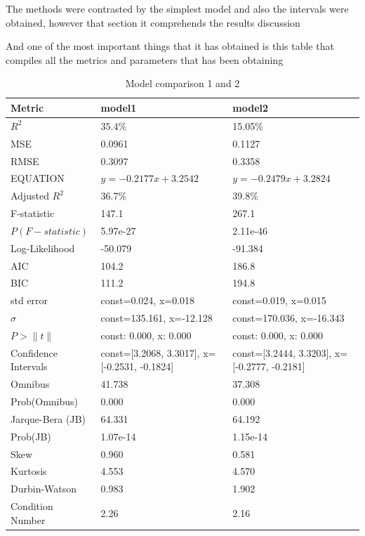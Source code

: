 \documentclass{article}
\begin{document}
The methods were contrasted by the simplest model and also the intervals were obtained, however that section it comprehends the results discussion

And one of the most important things that it has obtained is this table that compiles all the metrics and parameters that has been obtaining
\begin{table}[h]
  \scriptsize 
  \setlength{\extrarowheight}{-2pt} 
  \begin{tabular}{|l|l|l|}
  \hline
  \textbf{Metric} & \textbf{model1} & \textbf{model2} \\
  \hline
  $R^2$ & 35.4\% & 15.05\% \\
  \hline
  MSE & 0.0961 & 0.1127 \\
  \hline
  RMSE & 0.3097 & 0.3358 \\
  \hline
  EQUATION & $y=-0.2177x+3.2542$ & $y=-0.2479x+3.2824$ \\
  \hline
  Adjusted $R^2$ & 36.7\% & 39.8\% \\
  \hline
  F-statistic & 147.1 & 267.1 \\
  \hline
  $P(F-statistic)$ & 5.97e-27 & 2.11e-46 \\
  \hline
  Log-Likelihood & -50.079 & -91.384 \\
  \hline
  AIC & 104.2 & 186.8 \\
  \hline
  BIC & 111.2 & 194.8 \\
  \hline
  std error & const=0.024, x=0.018 & const=0.019, x=0.015 \\
  \hline
  $\sigma$ & const=135.161, x=-12.128 & const=170.036, x=-16.343 \\
  \hline
  $P>\|t\|$ & const: 0.000, x: 0.000 & const: 0.000, x: 0.000 \\
  \hline
  Confidence Intervals & const=[3.2068, 3.3017], x=[-0.2531, -0.1824] & const=[3.2444, 3.3203], x=[-0.2777, -0.2181] \\
  \hline
  Omnibus & 41.738 & 37.308 \\
  \hline
  Prob(Omnibus) & 0.000 & 0.000 \\
  \hline
  Jarque-Bera (JB) & 64.331 & 64.192 \\
  \hline
  Prob(JB) & 1.07e-14 & 1.15e-14 \\
  \hline
  Skew & 0.960 & 0.581 \\
  \hline
  Kurtosis & 4.553 & 4.570 \\
  \hline
  Durbin-Watson & 0.983 & 1.902 \\
  \hline
  Condition Number & 2.26 & 2.16 \\
  \hline
  \end{tabular}
  \caption{Model comparison 1 and 2}
  \label{tab:modelos12}
  \end{table}
\end{document}
